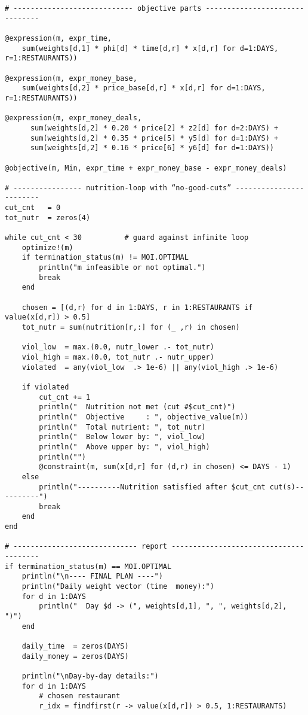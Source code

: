 \begin{verbatim}
# ---------------------------- objective parts -------------------------------

@expression(m, expr_time,
    sum(weights[d,1] * phi[d] * time[d,r] * x[d,r] for d=1:DAYS, r=1:RESTAURANTS))

@expression(m, expr_money_base,
    sum(weights[d,2] * price_base[d,r] * x[d,r] for d=1:DAYS, r=1:RESTAURANTS))

@expression(m, expr_money_deals,
      sum(weights[d,2] * 0.20 * price[2] * z2[d] for d=2:DAYS) +
      sum(weights[d,2] * 0.35 * price[5] * y5[d] for d=1:DAYS) +
      sum(weights[d,2] * 0.16 * price[6] * y6[d] for d=1:DAYS))

@objective(m, Min, expr_time + expr_money_base - expr_money_deals)

# ---------------- nutrition‑loop with “no‑good‑cuts” ------------------------
cut_cnt   = 0
tot_nutr  = zeros(4)

while cut_cnt < 30          # guard against infinite loop
    optimize!(m)
    if termination_status(m) != MOI.OPTIMAL
        println("m infeasible or not optimal.")
        break
    end

    chosen = [(d,r) for d in 1:DAYS, r in 1:RESTAURANTS if value(x[d,r]) > 0.5]
    tot_nutr = sum(nutrition[r,:] for (_ ,r) in chosen)

    viol_low  = max.(0.0, nutr_lower .- tot_nutr)
    viol_high = max.(0.0, tot_nutr .- nutr_upper)
    violated  = any(viol_low  .> 1e-6) || any(viol_high .> 1e-6)

    if violated
        cut_cnt += 1
        println("  Nutrition not met (cut #$cut_cnt)")
        println("  Objective     : ", objective_value(m))
        println("  Total nutrient: ", tot_nutr)
        println("  Below lower by: ", viol_low)
        println("  Above upper by: ", viol_high)
        println("")
        @constraint(m, sum(x[d,r] for (d,r) in chosen) <= DAYS - 1)
    else
        println("----------Nutrition satisfied after $cut_cnt cut(s)----------")
        break
    end
end

# ----------------------------- report ---------------------------------------
if termination_status(m) == MOI.OPTIMAL
    println("\n---- FINAL PLAN ----")
    println("Daily weight vector (time  money):")
    for d in 1:DAYS
        println("  Day $d -> (", weights[d,1], ", ", weights[d,2], ")")
    end

    daily_time  = zeros(DAYS)
    daily_money = zeros(DAYS)

    println("\nDay‑by‑day details:")
    for d in 1:DAYS
        # chosen restaurant
        r_idx = findfirst(r -> value(x[d,r]) > 0.5, 1:RESTAURANTS)


\end{verbatim}
